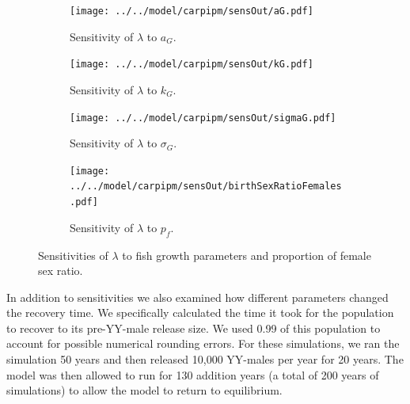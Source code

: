 \documentclass{article}[12pt]
\begin{document}
\begin{figure}[htbp]
	\centering
	\begin{subfigure}[b]{0.45\textwidth}
	   \texttt{[image: ../../model/carpipm/sensOut/aG.pdf]} %
	   \caption{Sensitivity of \(\lambda\) to \(a_G\).}
	   \label{fig:sensET}
	\end{subfigure}
	\begin{subfigure}[b]{0.45\textwidth}
	   \texttt{[image: ../../model/carpipm/sensOut/kG.pdf]} %
	   \caption{Sensitivity of \(\lambda\) to \(k_G\).}
	   \label{fig:sensEKG}
	\end{subfigure}
	\begin{subfigure}[b]{0.45\textwidth}
	   \texttt{[image: ../../model/carpipm/sensOut/sigmaG.pdf]} %
	   \caption{Sensitivity of \(\lambda\) to \(\sigma_G\).}
	   \label{fig:sensEKG}
	\end{subfigure}
	\begin{subfigure}[b]{0.45\textwidth}
	   \texttt{[image: ../../model/carpipm/sensOut/birthSexRatioFemales.pdf]} %
	   \caption{Sensitivity of \(\lambda\) to \(p_f\).}
	   \label{fig:sensPF}
	\end{subfigure}
     \caption{Sensitivities of \(\lambda\) to fish growth parameters and proportion of female sex ratio.}
   \label{fig:lengthSens}
\end{figure}



In addition to sensitivities we also examined how different parameters changed the recovery time. 
We specifically calculated the time it took for the population to recover to its pre-YY-male release size.
We used 0.99 of this population to account for possible numerical rounding errors.
For these simulations, we ran the simulation 50 years and then released 10,000 YY-males per year for 20 years. 
The model was then allowed to run for 130 addition years (a total of 200 years of simulations) to allow the model to return to equilibrium. 
\end{document}
